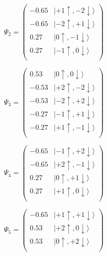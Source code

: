 \documentclass{article}
\begin{document}
\begin{equation}
\Psi_{2} = 
\begin{pmatrix}
-      0.65  &  |+1\uparrow , -2\downarrow\rangle  \\
-      0.65  &  |-2\uparrow , +1\downarrow\rangle  \\
      0.27  &  |0\uparrow , -1\downarrow\rangle  \\
      0.27  &  |-1\uparrow , 0\downarrow\rangle  \\
\end{pmatrix}
\end{equation}

\begin{equation}
\Psi_{3} = 
\begin{pmatrix}
      0.53  &  |0\uparrow , 0\downarrow\rangle  \\
-      0.53  &  |+2\uparrow , -2\downarrow\rangle  \\
-      0.53  &  |-2\uparrow , +2\downarrow\rangle  \\
-      0.27  &  |-1\uparrow , +1\downarrow\rangle  \\
-      0.27  &  |+1\uparrow , -1\downarrow\rangle  \\
\end{pmatrix}
\end{equation}

\begin{equation}
\Psi_{4} = 
\begin{pmatrix}
-      0.65  &  |-1\uparrow , +2\downarrow\rangle  \\
-      0.65  &  |+2\uparrow , -1\downarrow\rangle  \\
      0.27  &  |0\uparrow , +1\downarrow\rangle  \\
      0.27  &  |+1\uparrow , 0\downarrow\rangle  \\
\end{pmatrix}
\end{equation}

\begin{equation}
\Psi_{5} = 
\begin{pmatrix}
-      0.65  &  |+1\uparrow , +1\downarrow\rangle  \\
      0.53  &  |+2\uparrow , 0\downarrow\rangle  \\
      0.53  &  |0\uparrow , +2\downarrow\rangle  \\
\end{pmatrix}
\end{equation}
\end{document}
